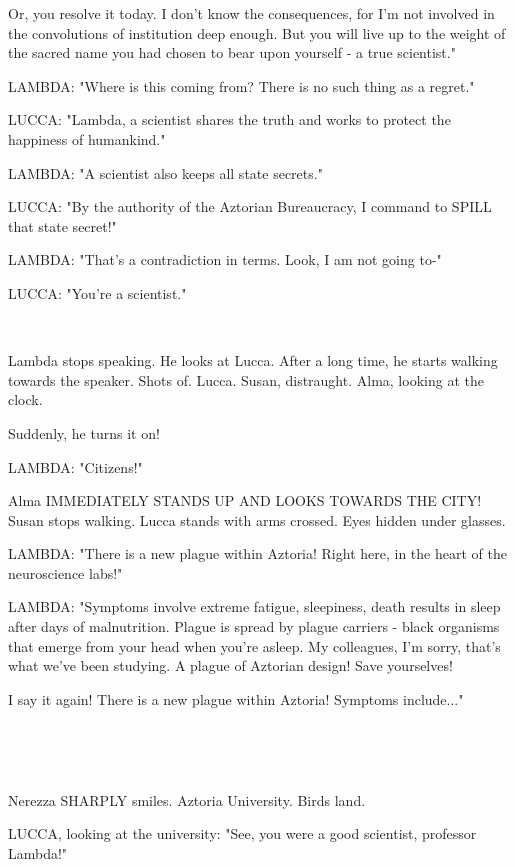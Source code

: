 \documentclass[11pt]{article}
\begin{document}
Or, you resolve it today.
I don't know the consequences, for I'm not involved in the convolutions of institution deep enough.
But you will live up to the weight of the sacred name you had chosen to bear upon yourself - a true scientist."

LAMBDA: "Where is this coming from? There is no such thing as a regret."

LUCCA: "Lambda, a scientist shares the truth and works to protect the happiness of humankind."

LAMBDA: "A scientist also keeps all state secrets."

LUCCA: "By the authority of the Aztorian Bureaucracy, I command to SPILL that state secret!"

LAMBDA: "That's a contradiction in terms. 
Look, I am not going to-"

LUCCA: "You're a scientist."

\ 

Lambda stops speaking. 
He looks at Lucca.
After a long time, he starts walking towards the speaker. 
Shots of.
Lucca.
Susan, distraught.
Alma, looking at the clock.

Suddenly, he turns it on!

LAMBDA: "Citizens!"

Alma IMMEDIATELY STANDS UP AND LOOKS TOWARDS THE CITY!
Susan stops walking.
Lucca stands with arms crossed. Eyes hidden under glasses.

LAMBDA: "There is a new plague within Aztoria! 
Right here, in the heart of the neuroscience labs!"

LAMBDA: "Symptoms involve extreme fatigue, sleepiness, death results in sleep after days of malnutrition.
Plague is spread by plague carriers - black organisms that emerge from your head when you're asleep.
My colleagues, I'm sorry, that's what we've been studying. 
A plague of Aztorian design!
Save yourselves! 

I say it again!
There is a new plague within Aztoria! 
Symptoms include..."

\ 

\ 

Nerezza SHARPLY smiles.
Aztoria University.
Birds land.

LUCCA, looking at the university: "See, you were a good scientist, professor Lambda!"
\end{document}

